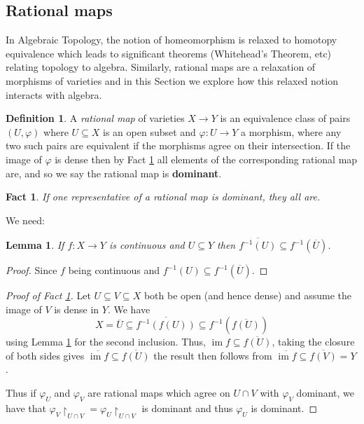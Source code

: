 \documentclass[12pt]{article}
\theoremstyle{plain}
\newtheorem{lemma}[thm]{Lemma}
\newtheorem{fact}[thm]{Fact}
\theoremstyle{definition}
\newtheorem{defn}[thm]{Definition} %
\newcommand{\lto}{\longrightarrow}
\begin{document}
\subsection{Rational maps}
In Algebraic Topology, the notion of homeomorphism is relaxed to homotopy equivalence which leads to significant theorems (Whitehead's Theorem, etc) relating topology to algebra. Similarly, rational maps are a relaxation of morphisms of varieties and in this Section we explore how this relaxed notion interacts with algebra.
\begin{defn}
A \emph{rational map} of varieties $X \lto Y$ is an equivalence class of pairs $(U,\varphi)$ where $U \subseteq X$ is an open subset and $\varphi: U \lto Y$ a morphism, where any two such pairs are equivalent if the morphisms agree on their intersection. If the image of $\varphi$ is dense then by Fact \ref{fact:dominant_rat_map} all elements of the corresponding rational map are, and so we say the rational map is \textbf{dominant}.
\end{defn}
\begin{fact}
\label{fact:dominant_rat_map}
If one representative of a rational map is dominant, they all are.
\end{fact}
%
We need:
\begin{lemma}
\label{lem:inv_img_closure}
If $f:X \lto Y$ is continuous and $U \subseteq Y$ then $\overline{f^{-1}(U)} \subseteq f^{-1}(\overline{U})$.
\end{lemma}
\begin{proof}
Since $f$ being continuous and $f^{-1}(U) \subseteq f^{-1}(\overline{U})$.
\end{proof}
\begin{proof}[Proof of Fact \ref{fact:dominant_rat_map}]
Let $U \subseteq V \subseteq X$ both be open (and hence dense) and assume the image of $V$ is dense in $Y$. We have
\[X = \overline{U} \subseteq \overline{f^{-1}(f(U))} \subseteq f^{-1}(\overline{f(U)})\]
using Lemma \ref{lem:inv_img_closure} for the second inclusion. Thus, $\operatorname{im} f \subseteq \overline{f(U)}$, taking the closure of both sides gives $\overline{\operatorname{im} f} \subseteq \overline{f(U)}$ the result then follows from $\overline{\operatorname{im} f} \subseteq \overline{f(V)} = Y$.

Thus if $\varphi_U$ and $\varphi_V$ are rational maps which agree on $U \cap V$ with $\varphi_V$ dominant, we have that $\varphi_V\restriction_{U \cap V} = \varphi_U\restriction_{U \cap V}$ is dominant and thus $\varphi_U$ is dominant.
\end{proof}
\end{document}
